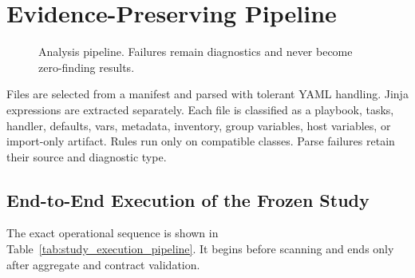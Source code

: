 \section{Evidence-Preserving Pipeline}
\begin{figure}[H]
\centering
{}
\caption{Analysis pipeline. Failures remain diagnostics and never become
zero-finding results.}
\label{fig:method_pipeline}
\end{figure}

Files are selected from a manifest and parsed with tolerant YAML handling.
Jinja expressions are extracted separately. Each file is classified as a
playbook, tasks, handler, defaults, vars, metadata, inventory, group variables,
host variables, or import-only artifact. Rules run only on compatible classes.
Parse failures retain their source and diagnostic type.

\subsection{End-to-End Execution of the Frozen Study}
The exact operational sequence is shown in
Table~\ref{tab:study_execution_pipeline}. It begins before scanning and ends
only after aggregate and contract validation.

